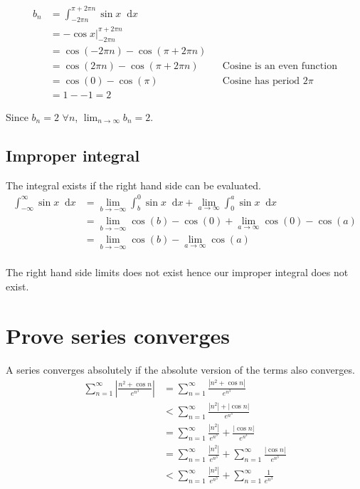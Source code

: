 \documentclass{article}
\newcommand{\diff}{\mathop{}\!\mathrm{d}}
\begin{document}
\begin{align*}
    b_n &= \int_{-2\pi n}^{\pi + 2\pi n} \sin x \diff x \\
    &= -\cos x \Big|_{-2\pi n}^{\pi + 2\pi n} \\
    &= \cos (-2\pi n) - \cos (\pi + 2\pi n) \\
    &= \cos (2\pi n) - \cos (\pi + 2\pi n)
    && \text{Cosine is an even function} \\
    &= \cos (0) - \cos (\pi)
    && \text{Cosine has period $2\pi$} \\
    &= 1 - -1 = 2
\end{align*}

Since $b_n = 2$ $\forall n$, $\lim_{n \to \infty} b_n = 2$.

\subsection{Improper integral}
The integral exists if the right hand side can be evaluated.
\begin{align*}
    \int_{-\infty}^{\infty} \sin x \diff x
    &= \lim_{b \to -\infty} \int_{b}^{0} \sin x \diff x
    + \lim_{a \to \infty} \int_{0}^{a} \sin x \diff x \\
    &= \lim_{b \to -\infty} \cos (b) - \cos (0)
    + \lim_{a \to \infty} \cos (0) - \cos (a) \\
    &= \lim_{b \to -\infty} \cos (b) - \lim_{a \to \infty} \cos (a) \\
\end{align*}

The right hand side limits does not exist hence our improper integral
does not exist.

\section{Prove series converges}
A series converges absolutely if the absolute version of the terms also
converges.
\begin{align*}
    \sum_{n=1}^\infty \left| \frac{n^2 + \cos n}{e^{n^3}} \right|
    &= \sum_{n=1}^\infty \frac{\left| n^2 + \cos n \right|}{e^{n^3}} \\
    &< \sum_{n=1}^\infty \frac{\left| n^2 \right| + \left| \cos n \right|}
    {e^{n^3}} \\
    &= \sum_{n=1}^\infty \frac{\left| n^2 \right|}{e^{n^3}}
    + \frac{\left| \cos n \right|}{e^{n^3}} \\
    &= \sum_{n=1}^\infty \frac{\left| n^2 \right|}{e^{n^3}}
    + \sum_{n=1}^\infty \frac{\left| \cos n \right|}{e^{n^3}} \\
    &< \sum_{n=1}^\infty \frac{\left| n^2 \right|}{e^{n^3}}
    + \sum_{n=1}^\infty \frac{1}{e^{n^3}} \\
\end{align*}
\end{document}
